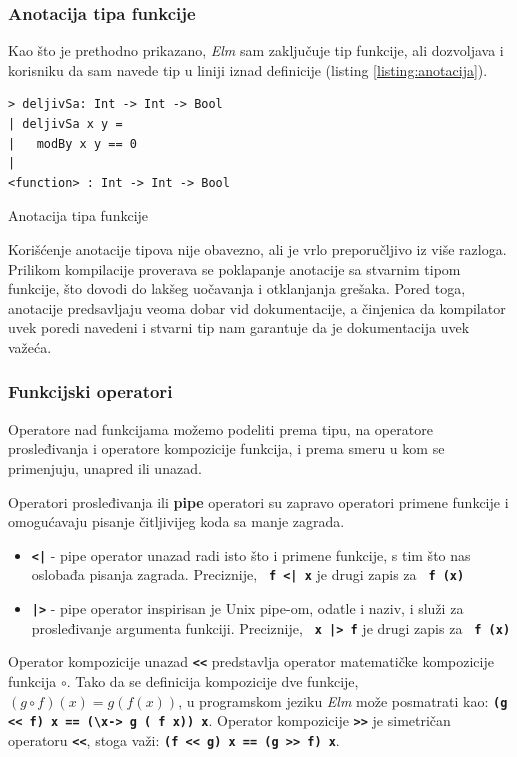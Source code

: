 \documentclass[12pt,oneside]{memoir}
\begin{document}
\subsubsection{Anotacija tipa funkcije}
Kao što je prethodno prikazano, \emph{Elm} sam zaključuje tip funkcije, ali dozvoljava i korisniku
da sam navede tip u liniji iznad definicije (listing \ref{listing:anotacija}).
\begin{listing}[!h]
\begin{verbatim}
> deljivSa: Int -> Int -> Bool
| deljivSa x y =
|   modBy x y == 0
|
<function> : Int -> Int -> Bool
\end{verbatim}
\caption{Anotacija tipa funkcije}
\label{listing:anotacija}
\end{listing}

Korišćenje anotacije tipova nije obavezno, ali je vrlo preporučljivo iz više razloga.
Prilikom kompilacije proverava se poklapanje anotacije sa stvarnim tipom funkcije, što
dovodi do lakšeg uočavanja i otklanjanja grešaka. Pored toga, anotacije predsavljaju veoma
dobar vid dokumentacije, a činjenica da kompilator uvek poredi navedeni i stvarni tip nam
garantuje da je dokumentacija uvek važeća.

\subsubsection{Funkcijski operatori}
Operatore nad funkcijama možemo podeliti prema tipu, na operatore prosleđivanja i operatore
kompozicije funkcija, i prema smeru u kom se primenjuju, unapred ili unazad.

Operatori prosleđivanja ili \textbf{pipe} operatori su zapravo operatori primene funkcije
i omogućavaju pisanje čitljivijeg koda sa manje zagrada.
\begin{itemize}
  \item \texttt{\textbf{<|}} - pipe operator unazad radi isto što i primene funkcije, 
  s tim što nas oslobađa pisanja zagrada. Preciznije, \texttt{\textbf{ f <| x}} je drugi zapis
  za \texttt{\textbf{ f (x)}}
  \item \texttt{\textbf{|>}} - pipe operator inspirisan je Unix pipe-om, odatle i
  naziv, i služi za prosleđivanje argumenta funkciji. Preciznije,  \texttt{\textbf{ x |> f}}
  je drugi zapis za \texttt{\textbf{ f (x)}}
\end{itemize}

Operator kompozicije unazad \texttt{\textbf{<\smallskip<}} predstavlja operator matematičke 
kompozicije funkcija \(\circ\). Tako da se definicija kompozicije dve funkcije, \((g \circ f)(x) = g(f(x))\),
u programskom jeziku \emph{Elm} može posmatrati kao: \texttt{\textbf{(g <\smallskip< f) x == (\textbackslash x\textunderscore ->
g ( f x\textunderscore)) x}}. Operator kompozicije \texttt{\textbf{>\smallskip>}} je
simetričan operatoru \texttt{\textbf{<\smallskip<}}, stoga važi: \texttt{\textbf{(f <\smallskip< g) x == (g >\smallskip> f) x}}.
\end{document}
